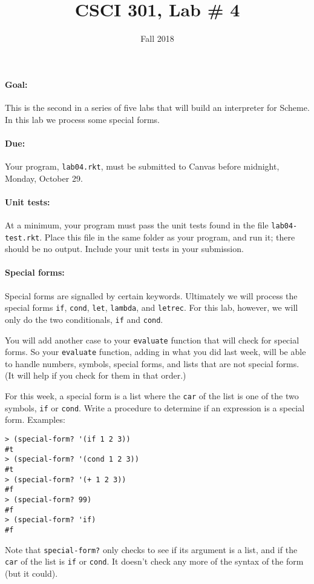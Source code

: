 \documentclass{article}
\title{CSCI 301, Lab \# 4}
\author{Fall 2018}
\date{}
\begin{document}
\maketitle


\paragraph{Goal:} This is the second in a series of five labs that will
build an interpreter for Scheme.  In this lab we process some special forms. 

\paragraph{Due:} Your program, {\tt lab04.rkt}, must be submitted to
Canvas before midnight, Monday, October 29.

\paragraph{Unit tests:}
At a minimum, your program must pass the unit tests found in the
file {\tt lab04-test.rkt}.  Place this file in the same folder
as your program, and run it;  there should be no output.  Include
your unit tests in your submission.

\paragraph{Special forms:}
Special forms are signalled by certain keywords.  Ultimately we
will process the special forms {\tt if}, {\tt cond}, {\tt let},
{\tt lambda}, and {\tt letrec}.  For this lab, however, we will only
do the two conditionals, {\tt if} and {\tt cond}.

You will add another case to your {\tt evaluate} function that will
check for special forms. So your {\tt evaluate} function, adding in
what you did last week, will be able to handle numbers, symbols,
special forms, and lists that are not special forms.  (It will help if
you check for them in that order.)

For this week, a special form is a list
where the {\tt car} of the list is one of the two symbols, {\tt if} or
{\tt cond}.  
Write a procedure to determine if an expression is a special form.
Examples:
\begin{Verbatim}[frame=single]
> (special-form? '(if 1 2 3))
#t
> (special-form? '(cond 1 2 3))
#t
> (special-form? '(+ 1 2 3))
#f
> (special-form? 99)
#f
> (special-form? 'if)
#f
\end{Verbatim}
Note that {\tt special-form?} only checks to see if its argument is a
list, and if the {\tt car} of the list is {\tt if} or {\tt cond}.  It
doesn't check any more of the syntax of the form (but it could).
\end{document}
